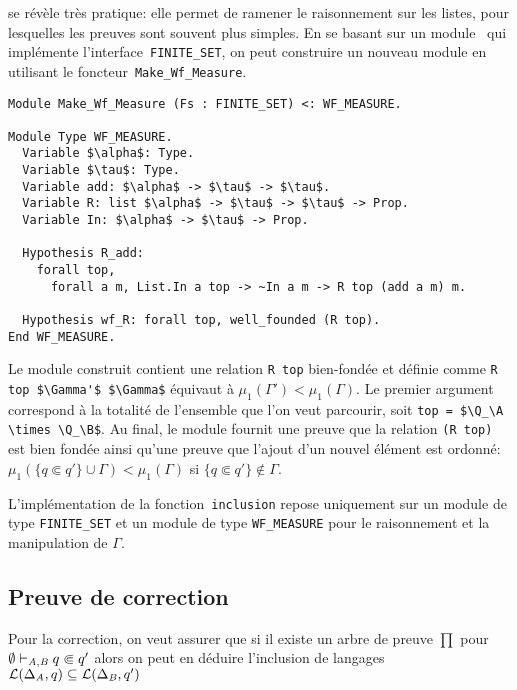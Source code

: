 se révèle très pratique: elle permet de ramener le raisonnement sur les listes, pour lesquelles les preuves
sont souvent plus simples.
En se basant sur un module \coq\ qui implémente l'interface~\lstinline!FINITE_SET!, on peut construire un nouveau module
en utilisant le foncteur~\lstinline!Make_Wf_Measure!.
\begin{lstlisting}
Module Make_Wf_Measure (Fs : FINITE_SET) <: WF_MEASURE.

Module Type WF_MEASURE.
  Variable $\alpha$: Type.
  Variable $\tau$: Type.
  Variable add: $\alpha$ -> $\tau$ -> $\tau$.
  Variable R: list $\alpha$ -> $\tau$ -> $\tau$ -> Prop.
  Variable In: $\alpha$ -> $\tau$ -> Prop.

  Hypothesis R_add:
    forall top,
      forall a m, List.In a top -> ~In a m -> R top (add a m) m.

  Hypothesis wf_R: forall top, well_founded (R top).
End WF_MEASURE.
\end{lstlisting}
Le module construit contient une relation \lstinline!R top! bien-fondée et
définie comme \lstinline!R top $\Gamma'$ $\Gamma$! équivaut à $\mu_1(\Gamma') < \mu_1(\Gamma)$.
Le premier argument correspond à la totalité de l'ensemble que l'on veut parcourir,
soit \lstinline!top = $\Q_\A \times \Q_\B$!. Au final, le module fournit une preuve que la relation 
\lstinline!(R top)! est bien fondée ainsi qu'une preuve que l'ajout d'un nouvel élément 
est ordonné: $\mu_1(\{q \Subset q'\} \cup \Gamma) < \mu_1(\Gamma)$ si $\{q \Subset q'\} \not\in \Gamma$.

L'implémentation de la fonction~\lstinline!inclusion! repose uniquement sur un module de type
\lstinline!FINITE_SET! et un module de type \lstinline!WF_MEASURE! pour le raisonnement et
la manipulation de $\Gamma$.



\subsection{Preuve de correction}
\label{sec:correction}

Pour la correction, on veut assurer que si il existe un arbre de preuve $\prod$
pour $\emptyset \vdash_{\mathit A, \mathit B} q \Subset q'$ alors on peut en déduire l'inclusion de langages
$\mathcal{L}(\Delta_\mathit A, q) \subseteq \mathcal{L}(\Delta_\mathit B, q')$


